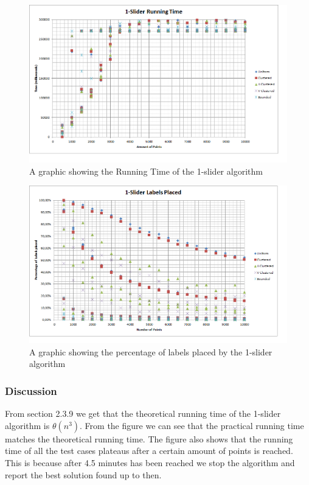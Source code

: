 \documentclass[crop=false,a4paper,oneside,11pt]{standalone}
\begin{document}
 \begin{figure}[h!]
 \centering
 \centerline{\includegraphics[scale = 0.65]{1slider.png}}
 \caption{A graphic showing the Running Time of the 1-slider algorithm}
 \end{figure}

 \begin{figure}[h!]
 \centering
  \centerline{\includegraphics[scale = 0.65]{1sliderplaced.png}}
  \caption{A graphic showing the percentage of labels placed by the 1-slider algorithm}
 \end{figure}

\subsubsection{Discussion}
From section 2.3.9 we get that the theoretical running time of the 1-slider algorithm is $\theta(n^3)$. From the figure we can see that the practical running time matches the theoretical running time. The figure also shows that the running time of all the test cases plateaus after a certain amount of points is reached. This is because after 4.5 minutes has been reached we stop the algorithm and report the best solution found up to then.
\end{document}
